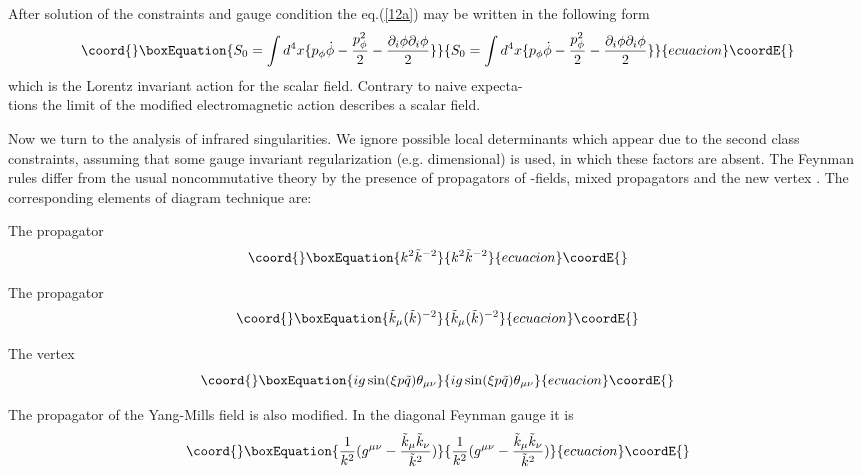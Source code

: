 \documentclass[a4paper,12pt]{article}
\begin{document}
After solution of the constraints and gauge condition the eq.(\ref{12a}) 
may be written in the following form 
\begin{equation}\coord{}\boxEquation{
S_0= \int d^4x \{p_{\phi} \dot \phi- \frac{p_{\phi}^2}{2}- 
 \frac{\partial_i\phi \partial_i \phi}{2}\}
\label{14} 
}{
S_0= \int d^4x \{p_{\phi} \dot \phi- \frac{p_{\phi}^2}{2}- 
 \frac{\partial_i\phi \partial_i \phi}{2}\}
}{ecuacion}\coordE{}\end{equation}
which is the Lorentz invariant action for the scalar field. Contrary to 
 naive expecta-\\tions the limit \coordHE{} of the modified 
electromagnetic action describes a scalar field.

Now we turn to the analysis of infrared singularities. We ignore 
 possible local determinants which appear due to the second class 
 constraints, assuming that some gauge invariant regularization (e.g. 
 dimensional) is used, in which these factors are absent. The Feynman 
 rules differ from the usual noncommutative 
 \coordHE{} theory by the presence of propagators of \myHighlight{$\lambda$}\coordHE{}-fields, mixed 
 propagators \coordHE{} and the new vertex \coordHE{}. The corresponding elements 
 of diagram technique are:

The propagator \myHighlight{$\lambda, \lambda$}\coordHE{}
 \begin{equation}\coord{}\boxEquation{ 
k^2 \tilde{k}^{-2}
\label{l5} 
}{ 
k^2 \tilde{k}^{-2}
}{ecuacion}\coordE{}\end{equation} 

The propagator \coordHE{}
\begin{equation}\coord{}\boxEquation{ 
\tilde{k}_{\mu}(\tilde{k})^{-2}
\label{16} 
}{ 
\tilde{k}_{\mu}(\tilde{k})^{-2}
}{ecuacion}\coordE{}\end{equation} 

The vertex \coordHE{}
\begin{equation}\coord{}\boxEquation{ 
ig \sin(\xi p \tilde{q}) \theta_{\mu \nu}
 \label{18} 
}{ 
ig \sin(\xi p \tilde{q}) \theta_{\mu \nu}
 }{ecuacion}\coordE{}\end{equation} 

The propagator of the Yang-Mills field is also modified. In the diagonal 
Feynman gauge it is
 \begin{equation}\coord{}\boxEquation{
\frac{1}{k^2}(g^{\mu \nu}- \frac{\tilde{k}_{\mu} 
\tilde{k}_{\nu}}{\tilde{k}^2})
 \label{19}
 }{
\frac{1}{k^2}(g^{\mu \nu}- \frac{\tilde{k}_{\mu} 
\tilde{k}_{\nu}}{\tilde{k}^2})
 }{ecuacion}\coordE{}\end{equation}
\end{document}
